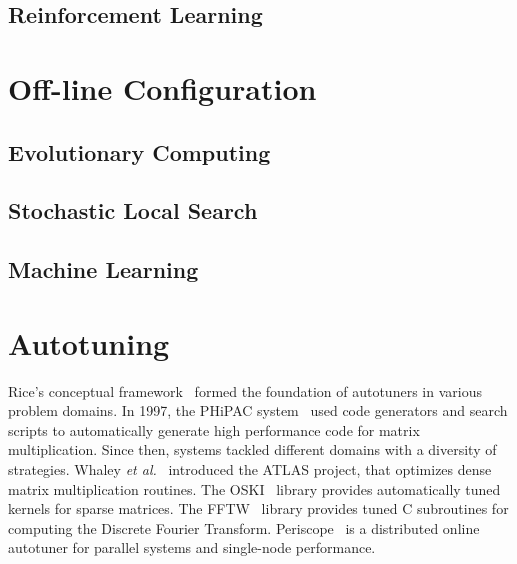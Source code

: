 \subsection{Reinforcement Learning}
\label{subsec:reinforce}

\section{Off-line Configuration}
\label{sec:offconfig}

\subsection{Evolutionary Computing}
\label{subsec:evolcomp}

\subsection{Stochastic Local Search}
\label{subsec:searchsls}

\subsection{Machine Learning}
\label{subsec:searchml}

\section{Autotuning}
\label{chap:autotuning}

Rice's conceptual framework~\cite{rice1976algorithm} formed the foundation
of autotuners in various problem domains.  In 1997, the PHiPAC
system~\cite{bilmes1997optimizing} used code generators and search scripts to
automatically generate high performance code
for matrix multiplication. Since then, systems tackled different domains with a
diversity of strategies. Whaley \emph{et al.}~\cite{dongarra1998automatically}
introduced the ATLAS project, that optimizes dense matrix multiplication
routines. The OSKI~\cite{vuduc2005oski} library provides automatically tuned
kernels for sparse matrices. The FFTW~\cite{frigo1998fftw} library provides
tuned C subroutines for computing the Discrete Fourier Transform.
Periscope~\cite{gerndt2010automatic} is a distributed online autotuner for
parallel systems and single-node performance.

